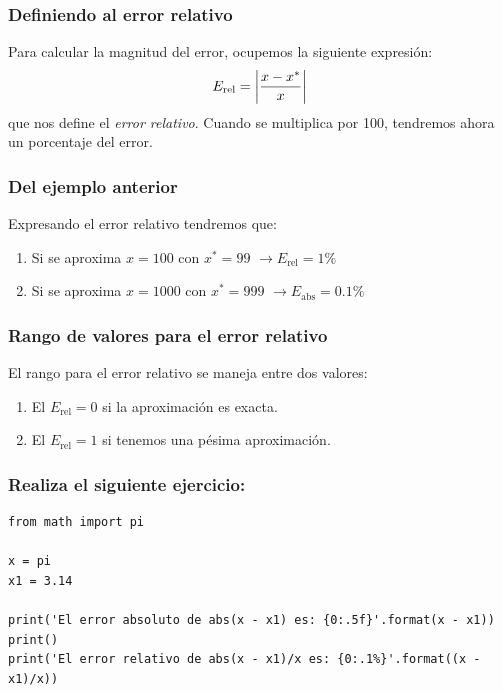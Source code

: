 \documentclass[12pt]{beamer}
\begin{document}
\begin{frame}
\frametitle{Definiendo al error relativo}
Para calcular la magnitud del error, ocupemos la siguiente expresión:
\pause
\begin{align*}
E_{\text{rel}} = \abs{\dfrac{x - x^{*}}{x}}
\end{align*}
que nos define el \emph{error relativo}. \pause Cuando se multiplica por 100, tendremos ahora un porcentaje del error.
\end{frame}
\begin{frame}
\frametitle{Del ejemplo anterior}
Expresando el error relativo tendremos que:
\pause
{}
\begin{enumerate}[<+->]
\item Si se aproxima $x = 100$ con $x^{*} = 99$ \pause $\to E_{\text{rel}} = 1\%$ \pause
\item Si se aproxima $x = 1000$ con $x^{*} = 999$ \pause $\to E_{\text{abs}} = 0.1\%$
\end{enumerate}
\end{frame}    
\begin{frame}
\frametitle{Rango de valores para el error relativo}
El rango para el error relativo se maneja entre dos valores:
\pause
{}
\begin{enumerate}[<+->]
\item El $E_{\text{rel}} = 0$ si la aproximación es exacta.
\item El $E_{\text{rel}} = 1$ si tenemos una pésima aproximación.
\end{enumerate}
\end{frame}
\begin{frame}[fragile]
\frametitle{Realiza el siguiente ejercicio:}
\begin{lstlisting}[caption=Obteniendo errores absoluto y relativo]
from math import pi

x = pi
x1 = 3.14

print('El error absoluto de abs(x - x1) es: {0:.5f}'.format(x - x1))
print()
print('El error relativo de abs(x - x1)/x es: {0:.1%}'.format((x - x1)/x))
\end{lstlisting}
\end{frame}
\end{document}
